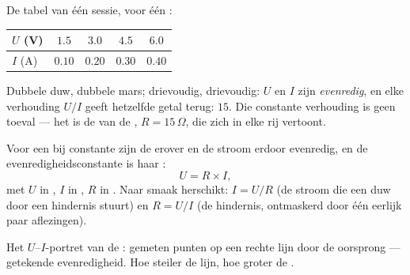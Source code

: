 \begin{example}\label{ex:g8:ohms-law:confession}
De tabel van één sessie, voor één :
\begin{center}
\begin{tabular}{l|cccc}
$U$ (\unit{V}) & $1.5$ & $3.0$ & $4.5$ & $6.0$ \\
\hline
$I$ (\unit{A}) & $0.10$ & $0.20$ & $0.30$ & $0.40$
\end{tabular}
\end{center}
Dubbele duw, dubbele mars; drievoudig, drievoudig: $U$ en $I$ zijn
\emph{evenredig}, en elke verhouding $U/I$ geeft hetzelfde getal terug:
$15$. Die constante verhouding is geen toeval --- het is de
 van de , $R = 15\,\Omega$, die
zich in elke rij vertoont.
\end{example}

\begin{proposition}\label{prop:g8:ohms-law:law}
Voor een  bij constante
 zijn de  erover en de
stroom erdoor evenredig, en de evenredigheidsconstante is haar
:
\[
U = R \times I ,
\]
met $U$ in , $I$ in , $R$ in
. Naar smaak herschikt: $I = U/R$ (de stroom die een duw
door een hindernis stuurt) en $R = U/I$ (de hindernis, ontmaskerd door
één eerlijk paar aflezingen).
\end{proposition}

\begin{omfigure}

{\small Het $U$--$I$-portret van de : gemeten punten op
een rechte lijn door de oorsprong --- getekende evenredigheid. Hoe
steiler de lijn, hoe groter de .}
\end{omfigure}

